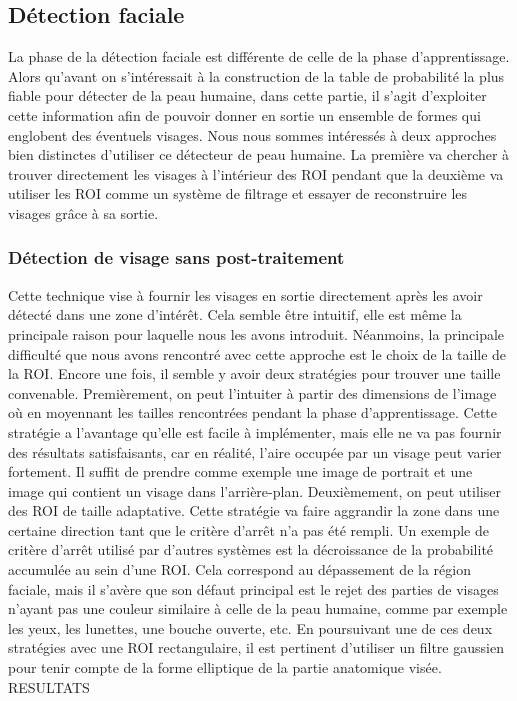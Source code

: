\documentclass[a4paper,11pt]{article}
\begin{document}
\subsection{Détection faciale}

La phase de la détection faciale est différente de celle de la phase d'apprentissage. 
Alors qu'avant on s'intéressait à la construction de la table de probabilité la plus fiable pour détecter de la peau humaine, dans cette partie, il s'agit d'exploiter cette information afin de pouvoir donner en sortie un ensemble de formes qui englobent des éventuels visages.
Nous nous sommes intéressés à deux approches bien distinctes d'utiliser ce \og détecteur de peau humaine\fg{}. 
La première va chercher à trouver directement les visages à l'intérieur des ROI pendant que la deuxième va utiliser les ROI comme un système de filtrage et essayer de reconstruire les visages grâce à sa sortie.
\newline
\subsubsection{Détection de visage sans post-traitement}
Cette technique vise à fournir les visages en sortie directement après les avoir détecté dans une zone d'intérêt.
Cela semble être intuitif, elle est même la principale raison pour laquelle nous les avons introduit.
Néanmoins, la principale difficulté que nous avons rencontré avec cette approche est le choix de la taille de la ROI.
Encore une fois, il semble y avoir deux stratégies pour trouver une taille convenable.
\newline
Premièrement, on peut l'intuiter à partir des dimensions de l'image où en moyennant les tailles rencontrées pendant la phase d'apprentissage.
Cette stratégie a l'avantage qu'elle est facile à implémenter, mais elle ne va pas fournir des résultats satisfaisants, car en réalité, l'aire occupée par un visage peut varier fortement.
Il suffit de prendre comme exemple une image de portrait et une image qui contient un visage dans l'arrière-plan.
\newline
Deuxièmement, on peut utiliser des ROI de taille adaptative. 
Cette stratégie va faire aggrandir la zone dans une certaine direction tant que le critère d'arrêt n'a pas été rempli.
Un exemple de critère d'arrêt utilisé par d'autres systèmes est la décroissance de la probabilité accumulée au sein d'une ROI.
Cela correspond au dépassement de la région faciale, mais il s'avère que son défaut principal est le rejet des parties de visages n'ayant pas une couleur similaire à celle de la peau humaine, comme par exemple les yeux, les lunettes, une bouche ouverte, etc.
\newline
\newline
En poursuivant une de ces deux stratégies avec une ROI rectangulaire, il est pertinent d'utiliser un filtre gaussien pour tenir compte de la forme elliptique de la partie anatomique visée.
RESULTATS
\end{document}

